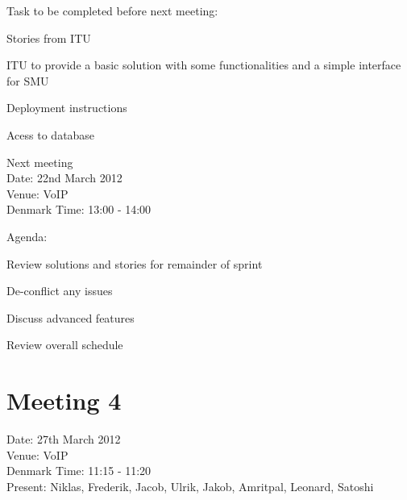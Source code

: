 Task to be completed before next meeting:
\begin{my_itemize}
\item Stories from ITU

\item ITU to provide a basic solution with some functionalities and a simple interface for SMU

	\begin{my_itemize}
	\item Deployment instructions

	\item Acess to database
	\end{my_itemize}

\end{my_itemize}

Next meeting\\
Date: 22nd March 2012\\
Venue: VoIP\\
Denmark Time: 13:00 - 14:00 
 
Agenda:
\begin{my_itemize}
\item Review solutions and stories for remainder of sprint

\item De-conflict any issues

\item Discuss advanced features

\item Review overall schedule

\end{my_itemize}

\pagebreak

\section{Meeting 4}

Date: 27th March 2012\\
Venue: VoIP\\
Denmark Time: 11:15 - 11:20\\
Present: Niklas, Frederik, Jacob, Ulrik, Jakob, Amritpal, Leonard, Satoshi

